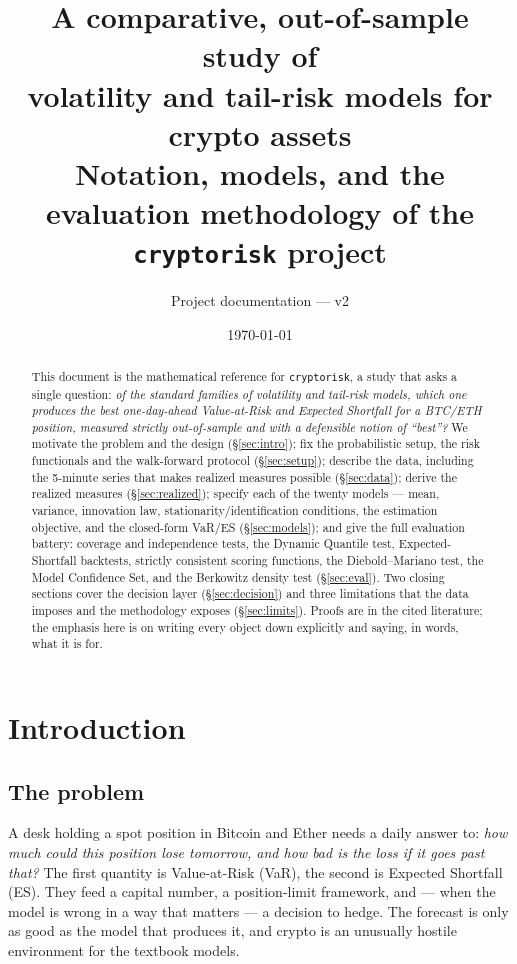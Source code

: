 \documentclass[11pt,a4paper]{article}
\title{\textbf{\Large A comparative, out-of-sample study of\\ volatility and tail-risk models for crypto assets}\\[6pt]
\large Notation, models, and the evaluation methodology of the \texttt{cryptorisk} project}
\author{Project documentation --- v2}
\date{\today}
\begin{document}
\maketitle

\begin{abstract}
This document is the mathematical reference for \texttt{cryptorisk}, a study that
asks a single question: \emph{of the standard families of volatility and
tail-risk models, which one produces the best one-day-ahead Value-at-Risk and
Expected Shortfall for a BTC/ETH position, measured strictly out-of-sample and
with a defensible notion of ``best''?} We motivate the problem and the design
(\S\ref{sec:intro}); fix the probabilistic setup, the risk functionals and the
walk-forward protocol (\S\ref{sec:setup}); describe the data, including the
5-minute series that makes realized measures possible (\S\ref{sec:data}); derive
the realized measures (\S\ref{sec:realized}); specify each of the twenty models
--- mean, variance, innovation law, stationarity/identification conditions, the
estimation objective, and the closed-form VaR/ES (\S\ref{sec:models}); and give
the full evaluation battery: coverage and independence tests, the Dynamic
Quantile test, Expected-Shortfall backtests, strictly consistent scoring
functions, the Diebold--Mariano test, the Model Confidence Set, and the
Berkowitz density test (\S\ref{sec:eval}). Two closing sections cover the
decision layer (\S\ref{sec:decision}) and three limitations that the data
imposes and the methodology exposes (\S\ref{sec:limits}). Proofs are in the
cited literature; the emphasis here is on writing every object down explicitly
and saying, in words, what it is for.
\end{abstract}

\tableofcontents

\section{Introduction}\label{sec:intro}

\subsection{The problem}

A desk holding a spot position in Bitcoin and Ether needs a daily answer to:
\emph{how much could this position lose tomorrow, and how bad is the loss if it
goes past that?} The first quantity is Value-at-Risk (VaR), the second is
Expected Shortfall (ES). They feed a capital number, a position-limit framework,
and --- when the model is wrong in a way that matters --- a decision to hedge.
The forecast is only as good as the model that produces it, and crypto is an
unusually hostile environment for the textbook models.
\end{document}
